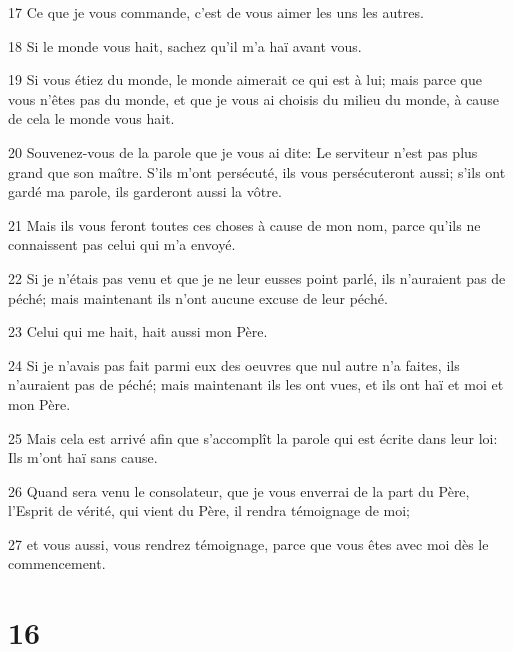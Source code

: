 \par 17 Ce que je vous commande, c'est de vous aimer les uns les autres.
\par 18 Si le monde vous hait, sachez qu'il m'a haï avant vous.
\par 19 Si vous étiez du monde, le monde aimerait ce qui est à lui; mais parce que vous n'êtes pas du monde, et que je vous ai choisis du milieu du monde, à cause de cela le monde vous hait.
\par 20 Souvenez-vous de la parole que je vous ai dite: Le serviteur n'est pas plus grand que son maître. S'ils m'ont persécuté, ils vous persécuteront aussi; s'ils ont gardé ma parole, ils garderont aussi la vôtre.
\par 21 Mais ils vous feront toutes ces choses à cause de mon nom, parce qu'ils ne connaissent pas celui qui m'a envoyé.
\par 22 Si je n'étais pas venu et que je ne leur eusses point parlé, ils n'auraient pas de péché; mais maintenant ils n'ont aucune excuse de leur péché.
\par 23 Celui qui me hait, hait aussi mon Père.
\par 24 Si je n'avais pas fait parmi eux des oeuvres que nul autre n'a faites, ils n'auraient pas de péché; mais maintenant ils les ont vues, et ils ont haï et moi et mon Père.
\par 25 Mais cela est arrivé afin que s'accomplît la parole qui est écrite dans leur loi: Ils m'ont haï sans cause.
\par 26 Quand sera venu le consolateur, que je vous enverrai de la part du Père, l'Esprit de vérité, qui vient du Père, il rendra témoignage de moi;
\par 27 et vous aussi, vous rendrez témoignage, parce que vous êtes avec moi dès le commencement.

\chapter{16}

